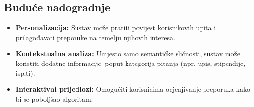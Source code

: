 \subsection{Buduće nadogradnje}

\begin{itemize}
    \item \textbf{Personalizacija:} Sustav može pratiti povijest korisnikovih upita i prilagođavati preporuke na temelju njihovih interesa.
    \item \textbf{Kontekstualna analiza:} Umjesto samo semantičke sličnosti, sustav može koristiti dodatne informacije, poput kategorija pitanja (npr. upis, stipendije, ispiti).
    \item \textbf{Interaktivni prijedlozi:} Omogućiti korisnicima ocjenjivanje preporuka kako bi se poboljšao algoritam.
\end{itemize}
